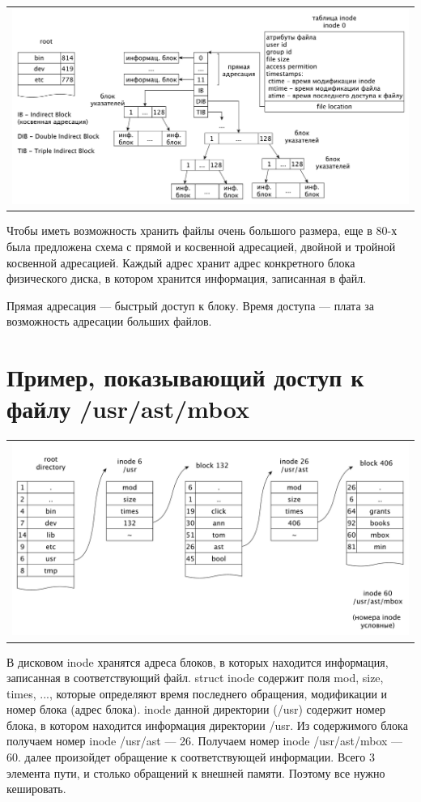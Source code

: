 \begin{table}[h!]
  \centering
  \begin{tabular}{p{1\linewidth}}
    \centering
    \includegraphics[width=0.8\linewidth]{./images/extX.pdf}
  \end{tabular}
\end{table}

Чтобы иметь возможность хранить файлы очень большого размера, еще в 80-х была предложена схема с прямой и косвенной адресацией, двойной и тройной косвенной адресацией. Каждый адрес хранит адрес конкретного блока физического диска, в котором хранится информация, записанная в файл.

Прямая адресация --- быстрый доступ к блоку. Время доступа --- плата за возможность адресации больших файлов.

\section{Пример, показывающий доступ к файлу /usr/ast/mbox}

\begin{table}[h!]
  \centering
  \begin{tabular}{p{1\linewidth}}
    \centering
    \includegraphics[width=0.8\linewidth]{./images/mbox.pdf}
  \end{tabular}
\end{table}

В дисковом inode хранятся адреса блоков, в которых находится информация, записанная в соответствующий файл. struct inode содержит поля mod, size, times, ..., которые определяют время последнего обращения, модификации и номер блока (адрес блока). inode данной директории (/usr) содержит номер блока, в котором находится информация директории /usr. Из содержимого блока получаем номер inode /usr/ast --- 26. Получаем номер inode /usr/ast/mbox --- 60. далее произойдет обращение к соответствующей информации. Всего 3 элемента пути, и столько обращений к внешней памяти. Поэтому все нужно кешировать.

